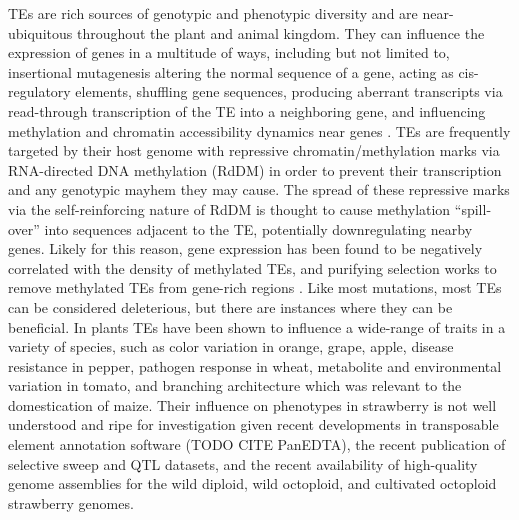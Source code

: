 \documentclass[fleqn,10pt]{olplainarticle}
\begin{document}
TEs are rich sources of genotypic and phenotypic diversity and are near-ubiquitous throughout the plant and animal kingdom.
They can influence the expression of genes in a multitude of ways, including but not limited to, insertional mutagenesis altering the normal sequence of a gene, acting as cis-regulatory elements, shuffling gene sequences, producing aberrant transcripts via read-through transcription of the TE into a neighboring gene, and influencing methylation and chromatin accessibility dynamics near genes \cite{Lisch2013,Choi2018a}.
TEs are frequently targeted by their host genome with repressive chromatin/methylation marks via RNA-directed DNA methylation (RdDM) in order to prevent their transcription and any genotypic mayhem they may cause.
The spread of these repressive marks via the self-reinforcing nature of RdDM is thought to cause methylation ``spill-over'' into sequences adjacent to the TE, potentially downregulating nearby genes.
Likely for this reason, gene expression has been found to be negatively correlated with the density of methylated TEs, and purifying selection works to remove methylated TEs from gene-rich regions \cite{Hollister2009b}.
Like most mutations, most TEs can be considered deleterious, but there are instances where they can be beneficial.
In plants TEs have been shown to influence a wide-range of traits in a variety of species, such as color variation in orange, grape, apple, disease resistance in pepper, pathogen response in wheat, metabolite and environmental variation in tomato, and branching architecture which was relevant to the domestication of maize.
Their influence on phenotypes in strawberry is not well understood and ripe for investigation given recent developments in transposable element annotation software \cite{Ou2019} (TODO CITE PanEDTA), the recent publication of selective sweep and QTL datasets, and the recent availability of high-quality genome assemblies for the wild diploid, wild octoploid, and cultivated octoploid strawberry genomes. \\
\end{document}
